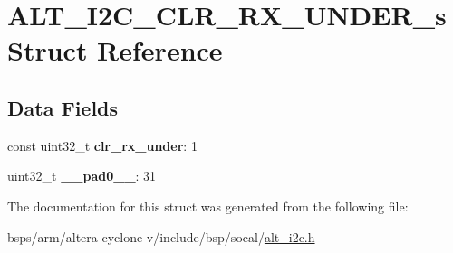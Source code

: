 \hypertarget{structALT__I2C__CLR__RX__UNDER__s}{}\section{A\+L\+T\+\_\+\+I2\+C\+\_\+\+C\+L\+R\+\_\+\+R\+X\+\_\+\+U\+N\+D\+E\+R\+\_\+s Struct Reference}
\label{structALT__I2C__CLR__RX__UNDER__s}
\subsection*{Data Fields}
\begin{DoxyCompactItemize}
\item 
\mbox{\label{structALT__I2C__CLR__RX__UNDER__s_ae364c4ee8bb86bbffe4dec5d1f3f5f07}} 
const uint32\+\_\+t {\bfseries clr\+\_\+rx\+\_\+under}\+: 1
\item 
\mbox{\label{structALT__I2C__CLR__RX__UNDER__s_addfbe252a4b246385b093f0f09cb00be}} 
uint32\+\_\+t {\bfseries \+\_\+\+\_\+pad0\+\_\+\+\_\+}\+: 31
\end{DoxyCompactItemize}


The documentation for this struct was generated from the following file\+:\begin{DoxyCompactItemize}
\item 
bsps/arm/altera-\/cyclone-\/v/include/bsp/socal/\mbox{\hyperlink{socal_2alt__i2c_8h}{alt\+\_\+i2c.\+h}}\end{DoxyCompactItemize}
